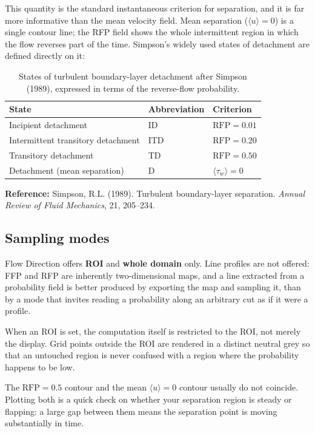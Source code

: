 \documentclass[11pt, a4paper]{report}
\begin{document}
This quantity is the standard instantaneous criterion for separation, and it is far more informative than the mean velocity field. Mean separation ($\langle u \rangle = 0$) is a single contour line; the RFP field shows the whole intermittent region in which the flow reverses part of the time. Simpson's widely used states of detachment are defined directly on it:

\begin{table}[htbp]
\centering
\caption{States of turbulent boundary-layer detachment after Simpson (1989), expressed in terms of the reverse-flow probability.}
\begin{tabular}{lll}
\toprule
\textbf{State} & \textbf{Abbreviation} & \textbf{Criterion} \\
\midrule
Incipient detachment            & ID  & $\mathrm{RFP} = 0.01$ \\
Intermittent transitory detachment & ITD & $\mathrm{RFP} = 0.20$ \\
Transitory detachment           & TD  & $\mathrm{RFP} = 0.50$ \\
Detachment (mean separation)    & D   & $\langle \tau_w \rangle = 0$ \\
\bottomrule
\end{tabular}
\end{table}

\noindent\textbf{Reference:} Simpson, R.L. (1989). Turbulent boundary-layer separation. \textit{Annual Review of Fluid Mechanics}, 21, 205--234.

\subsection*{Sampling modes}

Flow Direction offers \textbf{ROI} and \textbf{whole domain} only. Line profiles are not offered: FFP and RFP are inherently two-dimensional maps, and a line extracted from a probability field is better produced by exporting the map and sampling it, than by a mode that invites reading a probability along an arbitrary cut as if it were a profile.

When an ROI is set, the computation itself is restricted to the ROI, not merely the display. Grid points outside the ROI are rendered in a distinct neutral grey so that an untouched region is never confused with a region where the probability happens to be low.

\begin{tipbox}
The $\mathrm{RFP} = 0.5$ contour and the mean $\langle u \rangle = 0$ contour usually do not coincide. Plotting both is a quick check on whether your separation region is steady or flapping: a large gap between them means the separation point is moving substantially in time.
\end{tipbox}
\end{document}
